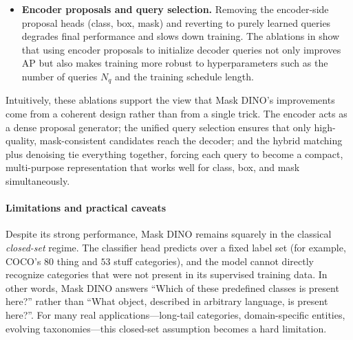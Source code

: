 \begin{enrichment}
\begin{enrichment}
\begin{itemize}
			\newpage
			
			Ablations that remove the mask term from the matching cost or restrict denoising to boxes only consistently reduce both detection and segmentation metrics, confirming that the model learns better queries when it is required to be simultaneously good at classifying, localizing, and segmenting.
			\item \textbf{Encoder proposals and query selection.} Removing the encoder-side proposal heads (class, box, mask) and reverting to purely learned queries degrades final performance and slows down training. The ablations in \cite{li2022_maskdino} show that using encoder proposals to initialize decoder queries not only improves AP but also makes training more robust to hyperparameters such as the number of queries \(N_q\) and the training schedule length.
		\end{itemize}
		
		Intuitively, these ablations support the view that Mask DINO’s improvements come from a coherent design rather than from a single trick. The encoder acts as a dense proposal generator; the unified query selection ensures that only high-quality, mask-consistent candidates reach the decoder; and the hybrid matching plus denoising tie everything together, forcing each query to become a compact, multi-purpose representation that works well for class, box, and mask simultaneously.
		
		\paragraph{Limitations and practical caveats}
		
		Despite its strong performance, Mask DINO remains squarely in the classical \emph{closed-set} regime. The classifier head predicts over a fixed label set (for example, COCO’s \(80\) thing and \(53\) stuff categories), and the model cannot directly recognize categories that were not present in its supervised training data. In other words, Mask DINO answers “Which of these predefined classes is present here?” rather than “What object, described in arbitrary language, is present here?”. For many real applications—long-tail categories, domain-specific entities, evolving taxonomies—this closed-set assumption becomes a hard limitation.
		

\end{enrichment}
\end{enrichment}
